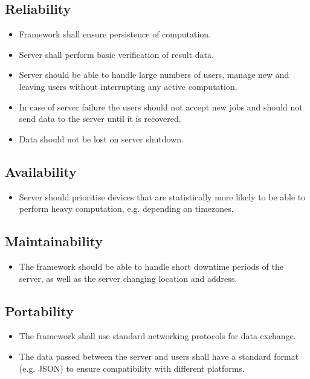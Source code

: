 \documentclass[a4paper,10pt]{article}
\begin{document}
\subsection{Reliability}

\begin{itemize}
	\item Framework shall ensure persistence of computation.
	\item Server shall perform basic verification of result data.
	\item Server should be able to handle large numbers of users, manage new and leaving users without interrupting any active computation.
	\item In case of server failure the users should not accept new jobs and should not send data to the server until it is recovered.
	\item Data should not be lost on server shutdown.
\end{itemize} 

\subsection{Availability}

\begin{itemize}
	\item Server should prioritise devices that are statistically more likely to be able to perform heavy computation, e.g. depending on timezones.

\end{itemize} 

\subsection{Maintainability}

\begin{itemize}
	\item The framework should be able to handle short downtime periods of the server, as well as the server changing location and address.

\end{itemize} 

\subsection{Portability}

\begin{itemize}
	\item The framework shall use standard networking protocols for data exchange.
	\item The data passed between the server and users shall have a standard format (e.g. JSON) to ensure compatibility with different platforms.
\end{itemize} 
\end{document}
